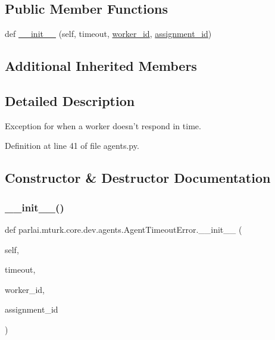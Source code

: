 \subsection*{Public Member Functions}
\begin{DoxyCompactItemize}
\item 
def \hyperlink{classparlai_1_1mturk_1_1core_1_1dev_1_1agents_1_1AgentTimeoutError_a392dd43c67cbfc005555e5bca543cf8b}{\+\_\+\+\_\+init\+\_\+\+\_\+} (self, timeout, \hyperlink{classparlai_1_1mturk_1_1core_1_1dev_1_1agents_1_1AbsentAgentError_a26db50c87a5d4954907d538de3da875c}{worker\+\_\+id}, \hyperlink{classparlai_1_1mturk_1_1core_1_1dev_1_1agents_1_1AbsentAgentError_ab9cf020196d28024b307c41a3fff6be1}{assignment\+\_\+id})
\end{DoxyCompactItemize}
\subsection*{Additional Inherited Members}


\subsection{Detailed Description}
\begin{DoxyVerb}Exception for when a worker doesn't respond in time.
\end{DoxyVerb}
 

Definition at line 41 of file agents.\+py.



\subsection{Constructor \& Destructor Documentation}
\mbox{\label{classparlai_1_1mturk_1_1core_1_1dev_1_1agents_1_1AgentTimeoutError_a392dd43c67cbfc005555e5bca543cf8b}} 
\subsubsection{\texorpdfstring{\+\_\+\+\_\+init\+\_\+\+\_\+()}{\_\_init\_\_()}}
{\footnotesize\ttfamily def parlai.\+mturk.\+core.\+dev.\+agents.\+Agent\+Timeout\+Error.\+\_\+\+\_\+init\+\_\+\+\_\+ (\begin{DoxyParamCaption}\item[{}]{self,  }\item[{}]{timeout,  }\item[{}]{worker\+\_\+id,  }\item[{}]{assignment\+\_\+id }\end{DoxyParamCaption})}



